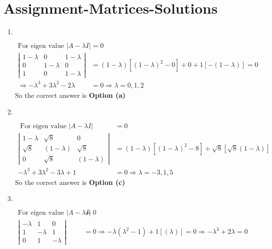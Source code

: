 \chapter{Assignment-Matrices-Solutions}
\begin{enumerate}
	\item  $\left. \right. $
	\begin{answer}
		\begin{align*}
		\text{For eigen value }|A-\lambda I|&=0\\
		\left|\begin{array}{ccc}
		1-\lambda & 0 & 1-\lambda \\
		0 & 1-\lambda & 0 \\
		1 & 0 & 1-\lambda
		\end{array}\right|&=(1-\lambda)\left[(1-\lambda)^{2}-0\right]+0+1[-(1-\lambda)]=0 \\
		\Rightarrow-\lambda^{3}+3 \lambda^{2}-2 \lambda&=0 \Rightarrow \lambda=0,1,2
		\end{align*}
		So the correct answer is \textbf{Option (a)}
	\end{answer}
	\item  $\left. \right. $
	\begin{answer}
		\begin{align*}
	\text{ For eigen value }|A-\lambda I|&=0\\
		\left|\begin{array}{ccc}
		1-\lambda & \sqrt{8} & 0 \\
		\sqrt{8} & (1-\lambda) & \sqrt{8} \\
		0 & \sqrt{8} & (1-\lambda)
		\end{array}\right|&=(1-\lambda)\left[(1-\lambda)^{2}-8\right]+\sqrt{8}[\sqrt{8}(1-\lambda)] \\
		-\lambda^{3}+3 \lambda^{2}-3 \lambda+1&=0 \Rightarrow \lambda=-3,1,5
		\end{align*}
			So the correct answer is \textbf{Option (c)}
	\end{answer}
	\item $\left. \right. $
	\begin{answer}
		\begin{align*}
	\text{For eigen value }|A-\lambda I|&=0\\
		\left|\begin{array}{ccc}
		-\lambda & 1 & 0 \\
		1 & -\lambda & 1 \\
		0 & 1 & -\lambda
		\end{array}\right|&=0 \Rightarrow-\lambda\left(\lambda^{2}-1\right)+1[(\lambda)]=0 \Rightarrow-\lambda^{3}+2 \lambda=0 \\

\end{align*}
\end{answer}
\end{enumerate}
